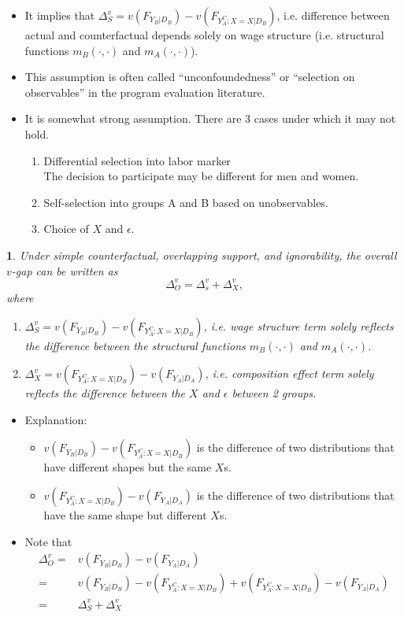 \documentclass[a4paper, 12pt]{article}
\makeatletter
\newtheorem*{prop*}{\propnumber}
\providecommand{\propnumber}{}
\newenvironment{prop}[2]
 {%
  \renewcommand{\propnumber}{Proposition #1 \textit{(#2)}}%
  \begin{prop*}%
  \protected@edef\@currentlabel{#1}%
 }
 {%
  \end{prop*}
 }
\makeatother
\begin{document}
\begin{itemize}
\item It implies that $\Delta^v_S = v(F_{Y_B|D_B})-v(F_{Y_A^C:X=X|D_B})$, i.e. difference between actual and counterfactual depends solely on wage structure (i.e. structural functions $m_B(\cdot,\cdot)$ and $m_A(\cdot,\cdot)$).
\item This assumption is often called ``unconfoundedness'' or ``selection on observables'' in the program evaluation literature.
\item It is somewhat strong assumption. There are 3 cases under which it may not hold.
\begin{enumerate}
\item Differential selection into labor marker \\
The decision to participate may be different for men and women.
\item Self-selection into groups A and B based on unobservables.
\item Choice of $X$ and $\epsilon$.
\end{enumerate}
\end{itemize}

\begin{prop}{1}{Identification of the Aggregate Decomposition}
Under simple counterfactual, overlapping support, and ignorability, the overall $v$-gap can be written as
$$
\Delta^v_O = \Delta^v_s + \Delta^v_X,
$$
where
\begin{enumerate}
\item $\Delta^v_S = v(F_{Y_B|D_B})-v(F_{Y_A^C:X=X|D_B})$, i.e. wage structure term solely reflects the difference between the structural functions $m_B(\cdot,\cdot)$ and $m_A(\cdot,\cdot)$.
\item $\Delta^v_X = v(F_{Y_A^C:X=X|D_B}) - v(F_{Y_A|D_A})$, i.e. composition effect term solely reflects the difference between the $X$ and $\epsilon$ between 2 groups.
\end{enumerate}
\end{prop}
\begin{itemize}
\item Explanation:
\begin{itemize}
\item $v(F_{Y_B|D_B})-v(F_{Y_A^C:X=X|D_B})$ is the difference of two distributions that have different shapes but the same $X$s. 
\item $v(F_{Y_A^C:X=X|D_B}) - v(F_{Y_A|D_A})$ is the difference of two distributions that have the same shape but different $X$s. 
\end{itemize}

\item Note that 
\begin{align*}
\Delta^v_O 
=& v(F_{Y_B|D_B}) - v(F_{Y_A|D_A}) \\
=& v(F_{Y_B|D_B})-v(F_{Y_A^C:X=X|D_B}) + v(F_{Y_A^C:X=X|D_B}) - v(F_{Y_A|D_A}) \\
=&
\Delta^v_S + \Delta^v_X \\
\end{align*}
\end{itemize}
\end{document}
